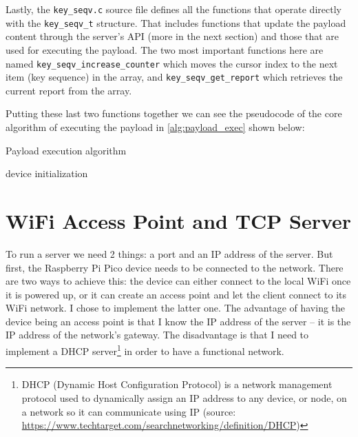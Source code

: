 Lastly, the \verb|key_seqv.c| source file defines all the functions that operate directly with the \verb|key_seqv_t| structure. That includes functions that update the payload content through the server's API (more in the next section) and those that are used for executing the payload. The two most important functions here are named \verb|key_seqv_increase_counter| \linebreak which moves the cursor index to the next item (key sequence) in the array, and \linebreak\verb|key_seqv_get_report| which retrieves the current report from the array.

Putting these last two functions together we can see the pseudocode of the core algorithm of executing the payload in \autoref{alg:payload_exec} shown below:

\begin{algorithm}
\caption{Payload execution algorithm}
\label{alg:payload_exec}
\BlankLine
device initialization\;
\end{algorithm}

\section{WiFi Access Point and TCP Server}
To run a server we need 2 things: a port and an IP address of the server. But first, the Raspberry Pi Pico device needs to be connected to the network. There are two ways to achieve this: the device can either connect to the local WiFi once it is powered up, or it can create an access point and let the client connect to its WiFi network. I chose to implement the latter one. The advantage of having the device being an access point is that I know the IP address of the server \--- it is the IP address of the network's gateway. The disadvantage is that I need to implement a DHCP server\footnote{DHCP (Dynamic Host Configuration Protocol) is a network management protocol used to dynamically assign an IP address to any device, or node, on a network so it can communicate using IP (source: \url{https://www.techtarget.com/searchnetworking/definition/DHCP})} in order to have a functional network.

